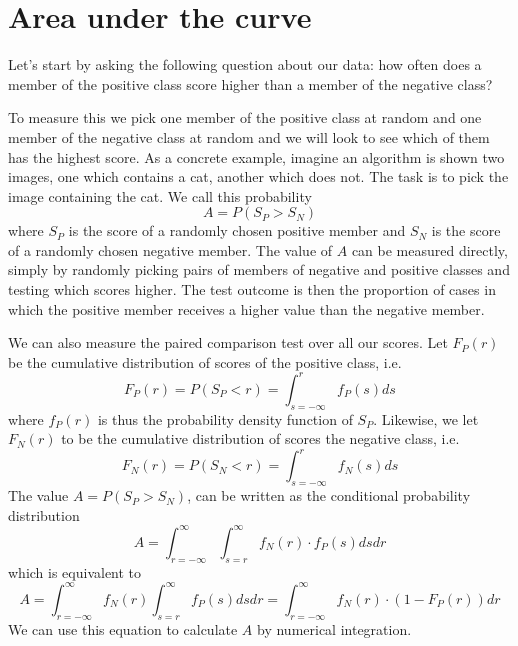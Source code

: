 \documentclass[preprint,12pt]{article}
\begin{document}
\section{Area under the curve} 

Let's start by asking the following question about our data: how often does a member of the positive class score higher than a member of the negative class? 

To measure this we pick one member of the positive class at random and one member of the negative class at random and we will look to see which of them has the highest score. As a concrete example, imagine an algorithm is shown two images, one which contains a cat, another which does not. The task is to pick the image containing the cat. We call this probability 
\[
A = P(S_P>S_N)
\]
where $S_P$ is the score of a randomly chosen positive member and $S_N$ is the score of a randomly chosen negative member. The value of $A$ can be measured directly, simply by randomly picking pairs of members of negative and positive classes and testing which scores higher. The test outcome is then the proportion of cases in which the positive member receives a higher value than the negative member.

We can also measure the paired comparison test over all our scores. Let $F_P(r)$ be the cumulative distribution of scores of the positive class, i.e. 
\begin{equation}
F_P(r) = P(S_P < r) = \int_{s=-\infty}^{r} f_P(s) ds \label{eq:ScorefPr}
\end{equation}
where $f_P(r)$ is thus the probability density function of $S_P$. Likewise, we let $F_N(r)$ to be the cumulative distribution of scores the negative class, i.e. 
\begin{equation}
F_N(r) = P(S_N < r) = \int_{s=-\infty}^{r} f_N(s) ds \label{eq:ScorenPr}
\end{equation}
The value $A=P(S_P>S_N)$, can be written as the conditional probability distribution
\begin{equation}
A = \int_{r=-\infty}^{\infty} \int_{s=r}^{\infty}  f_N(r) \cdot  f_P(s) ds dr  \label{eq:SPgreaterSN}
\end{equation}
which is equivalent to
\begin{equation}
A = \int_{r=-\infty}^{\infty}  f_N(r)  \int_{s=r}^{\infty}  f_P(s) ds dr  = \int_{r=-\infty}^{\infty}  f_N(r) \cdot  \left(1 -  F_P(r) \right) dr \label{eq:SPgreaterSN2}
\end{equation}
We can use this equation to calculate $A$ by numerical integration. 
\end{document}

